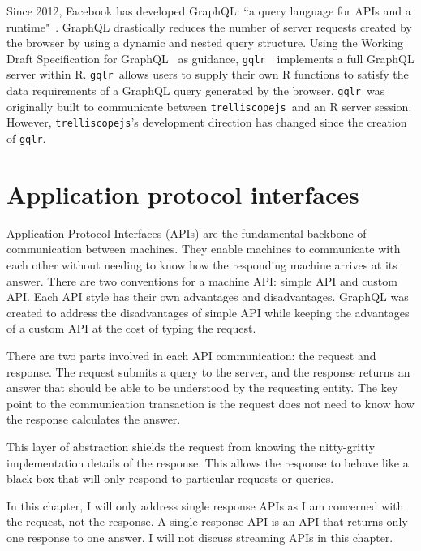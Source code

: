 \documentclass[stat,dissertation]{puthesis}\usepackage[]{graphicx}\usepackage{xcolor}
\newcommand{\pkg}[1]{\texttt{#1}}
\newcommand{\trelliscopejs}{\pkg{trelliscopejs}}
\newcommand{\gqlr}{\pkg{gqlr}}
\begin{document}


Since 2012, Facebook has developed GraphQL: ``a query language for APIs and a runtime"~\cite{graphql_org}.  GraphQL drastically reduces the number of server requests created by the browser by using a dynamic and nested query structure.  Using the Working Draft Specification for GraphQL~\cite{graphql_spec} as guidance, \gqlr~\cite{r_gqlr}~implements a full GraphQL server within R.  \gqlr~allows users to supply their own R functions to satisfy the data requirements of a GraphQL query generated by the browser.  \gqlr~was originally built to communicate between \trelliscopejs~and an R server session.  However, \trelliscopejs's development direction has changed since the creation of \gqlr.


\section{Application protocol interfaces}

Application Protocol Interfaces (APIs) are the fundamental backbone of communication between machines.  They enable machines to communicate with each other without needing to know how the responding machine arrives at its answer.  There are two conventions for a machine API: simple API and custom API.  Each API style has their own advantages and disadvantages.  GraphQL was created to address the disadvantages of simple API while keeping the advantages of a custom API at the cost of typing the request.


There are two parts involved in each API communication: the request and response.  The request submits a query to the server, and the response returns an answer that should be able to be understood by the requesting entity.  The key point to the communication transaction is the request does not need to know how the response calculates the answer.

This layer of abstraction shields the request from knowing the nitty-gritty implementation details of the response.  This allows the response to behave like a black box that will only respond to particular requests or queries.


In this chapter, I will only address single response APIs as I am concerned with the request, not the response.  A single response API is an API that returns only one response to one answer.  I will not discuss streaming APIs in this chapter.
\end{document}
